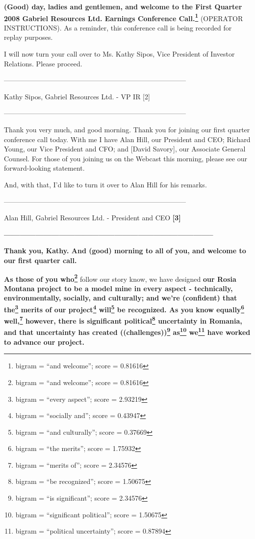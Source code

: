 \documentclass{article}
\begin{document}
 \textbf{(Good) day, ladies and gentlemen, and welcome to the First Quarter 2008 Gabriel Resources Ltd. Earnings Conference Call.\footnote{bigram = ``and welcome''; score = 0.81616}} (OPERATOR INSTRUCTIONS). As a reminder, this conference call is being recorded for replay purposes. 

 I will now turn your call over to Ms. Kathy Sipos, Vice President of Investor Relations. Please proceed. 

 -------------------------------------------------------------------------------- 

 Kathy Sipos, Gabriel Resources Ltd. - VP IR [2] 

 -------------------------------------------------------------------------------- 

 Thank you very much, and good morning. Thank you for joining our first quarter conference call today. With me I have Alan Hill, our President and CEO; Richard Young, our Vice President and CFO; and [David Savory], our Associate General Counsel. For those of you joining us on the Webcast this morning, please see our forward-looking statement. 

 And, with that, I'd like to turn it over to Alan Hill for his remarks. 

 -------------------------------------------------------------------------------- 

 Alan Hill, Gabriel Resources Ltd. - President and CEO \textbf{[3]} 

 \textbf{--------------------------------------------------------------------------------} 

 \textbf{Thank you, Kathy. And (good) morning to all of you, and welcome to our first quarter call.} 

 \textbf{As those of you who\footnote{bigram = ``and welcome''; score = 0.81616}} follow our story know, we have designed \textbf{our Rosia Montana project to be a model mine in every aspect - technically, environmentally, socially, and culturally; and we're (confident) that the\footnote{bigram = ``every aspect''; score = 2.93219} merits of our project\footnote{bigram = ``socially and''; score = 0.43947} will\footnote{bigram = ``and culturally''; score = 0.37669} be recognized. As you know equally\footnote{bigram = ``the merits''; score = 1.75932} well,\footnote{bigram = ``merits of''; score = 2.34576} however, there is significant political\footnote{bigram = ``be recognized''; score = 1.50675} uncertainty in Romania, and that uncertainty has created ((challenges))\footnote{bigram = ``is significant''; score = 2.34576} as\footnote{bigram = ``significant political''; score = 1.50675} we\footnote{bigram = ``political uncertainty''; score = 0.87894} have worked to advance our project.} 
\end{document}
